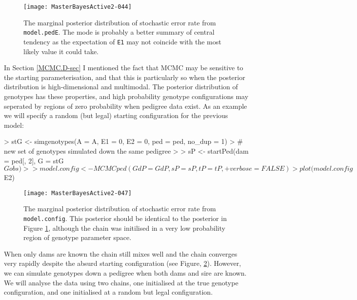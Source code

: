 \documentclass{article}
\begin{document}
\begin{figure}[!h]
\begin{center}
\texttt{[image: MasterBayesActive2-044]}
\end{center}
\caption{The marginal posterior distribution of stochastic error rate from \texttt{model.pedE}. The mode is probably a better summary of central tendency as the expectation of \texttt{E1} may not coincide with the most likely value it could take.}
\label{E2-fig}
\end{figure}


In Section \ref{MCMC.D-sec} I mentioned the fact that MCMC may be sensitive to the starting parameterisation, and that this is particularly so when the posterior distribution is high-dimensional and multimodal.  The posterior distribution of genotypes has these properties, and high probability genotype configurations may seperated by regions of zero probability when pedigree data exist.  As an example we will specify a random (but legal) starting configuration for the previous model:

\begin{Schunk}
\begin{Sinput}
> stG <- simgenotypes(A = A, E1 = 0, E2 = 0, ped = ped, no_dup = 1)
> # new set of genotypes simulated down the same pedigree
>
> sP <- startPed(dam = ped[, 2], G = stG$Gobs)
>
> model.config <- MCMCped(GdP = GdP, sP = sP, tP = tP,
+     verbose = FALSE)
> plot(model.config$E2)
\end{Sinput}
\end{Schunk}



\begin{figure}[!h]
\begin{center}
\texttt{[image: MasterBayesActive2-047]}
\end{center}
\caption{The marginal posterior distribution of stochastic error rate from \texttt{model.config}. This posterior should be identical to the posterior in Figure \ref{E2-fig}, although the chain was initilised in a very low probability region of genotype parameter space.}
\label{E2con-fig}
\end{figure}

When only dams are known the chain still mixes well and the chain converges very rapidly despite the absurd starting configuration (see Figure, \ref{E2con-fig}).  However, we can simulate genotypes down a pedigree when both dams and sire are known.  We will analyse the data using two chains, one initialised at the true genotype configuration, and one initialised at a random but legal configuration.
\end{document}
